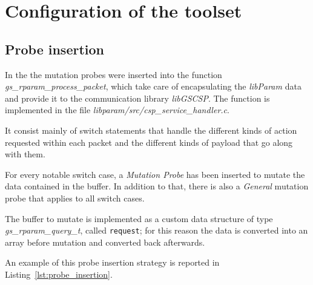 
\chapter{Configuration of the toolset}

\section{Probe insertion}

In the \case the mutation probes were inserted into the function \emph{gs\_rparam\_process\_packet}, which take care of encapsulating the \emph{libParam} data and provide it to the communication library \emph{libGSCSP}. The function is implemented in the file \emph{libparam/src/csp\_service\_handler.c}.

It consist mainly of switch statements that handle the different kinds of action requested within each packet and the different kinds of payload that go along with them.

For every notable switch case, a \emph{Mutation Probe} has been inserted to mutate the data contained in the buffer. In addition to that, there is also a \emph{General} mutation probe that applies to all switch cases.

The buffer to mutate is implemented as a custom data structure of type \emph{gs\_rparam\_query\_t}, called \texttt{request}; for this reason the data is converted into an array before mutation and converted back afterwards.

An example of this probe insertion strategy is reported in Listing~\ref{lst:probe_insertion}.

